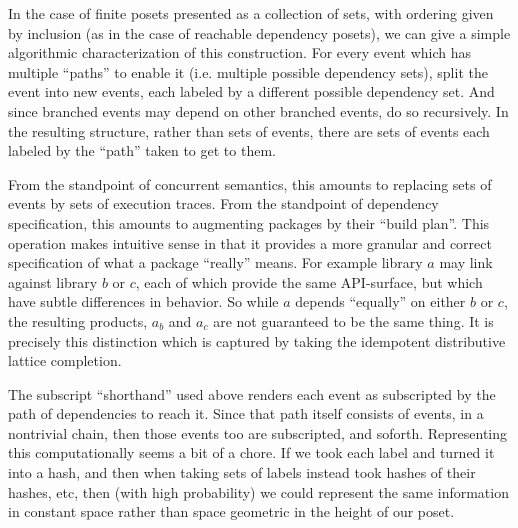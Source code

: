 \documentclass[hoptionsi,review,screen,format=acmsmall]{acmart}
\theoremstyle{definition}
\begin{document}
In the case of finite posets presented as a collection of sets, with ordering given by inclusion (as in the case of reachable dependency posets), we can give a simple algorithmic characterization of this construction. For every event which has multiple ``paths'' to enable it (i.e. multiple possible dependency sets), split the event into new events, each labeled by a different possible dependency set. And since branched events may depend on other branched events, do so recursively. In the resulting structure, rather than sets of events, there are sets of events each labeled by the ``path'' taken to get to them. 

From the standpoint of concurrent semantics, this amounts to replacing sets of events by sets of execution traces. From the standpoint of dependency specification, this amounts to augmenting packages by their ``build plan''. This operation makes intuitive sense in that it provides a more granular and correct specification of what a package ``really'' means. For example library \(a\) may link against library \(b\) or \(c\), each of which provide the same API-surface, but which have subtle differences in behavior. So while \(a\) depends ``equally'' on either \(b\) or \(c\), the resulting products, \(a_b\) and \(a_c\) are not guaranteed to be the same thing. It is precisely this distinction which is captured by taking the idempotent distributive lattice completion.

The subscript ``shorthand'' used above renders each event as subscripted by the path of dependencies to reach it. Since that path itself consists of events, in a nontrivial chain, then those events too are subscripted, and soforth. Representing this computationally seems a bit of a chore. If we took each label and turned it into a hash, and then when taking sets of labels instead took hashes of their hashes, etc, then (with high probability) we could represent the same information in constant space rather than space geometric in the height of our poset.
\end{document}
